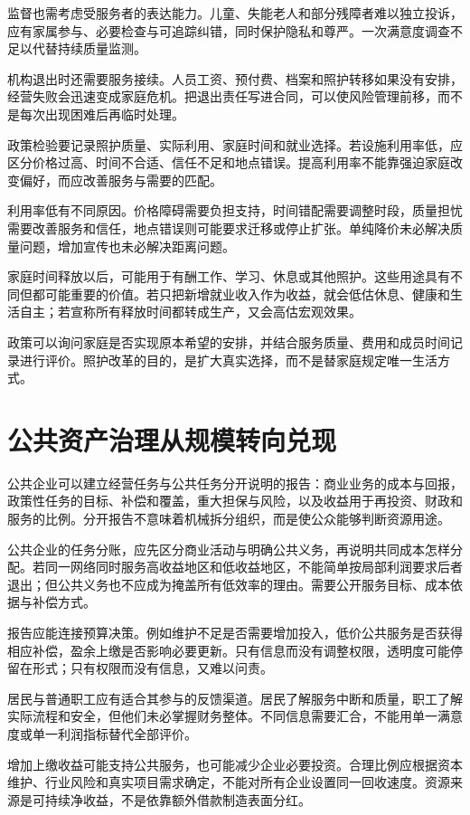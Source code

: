 \documentclass[UTF8,fontset=fandol,zihao=-4,oneside,openany]{ctexbook}
\begin{document}
监督也需考虑受服务者的表达能力。儿童、失能老人和部分残障者难以独立投诉，应有家属参与、必要检查与可追踪纠错，同时保护隐私和尊严。一次满意度调查不足以代替持续质量监测。

机构退出时还需要服务接续。人员工资、预付费、档案和照护转移如果没有安排，经营失败会迅速变成家庭危机。把退出责任写进合同，可以使风险管理前移，而不是每次出现困难后再临时处理。

政策检验要记录照护质量、实际利用、家庭时间和就业选择。若设施利用率低，应区分价格过高、时间不合适、信任不足和地点错误。提高利用率不能靠强迫家庭改变偏好，而应改善服务与需要的匹配。

\label{arg:P257}
利用率低有不同原因。价格障碍需要负担支持，时间错配需要调整时段，质量担忧需要改善服务和信任，地点错误则可能要求迁移或停止扩张。单纯降价未必解决质量问题，增加宣传也未必解决距离问题。

家庭时间释放以后，可能用于有酬工作、学习、休息或其他照护。这些用途具有不同但都可能重要的价值。若只把新增就业收入作为收益，就会低估休息、健康和生活自主；若宣称所有释放时间都转成生产，又会高估宏观效果。

政策可以询问家庭是否实现原本希望的安排，并结合服务质量、费用和成员时间记录进行评价。照护改革的目的，是扩大真实选择，而不是替家庭规定唯一生活方式。

\section{公共资产治理从规模转向兑现}
公共企业可以建立经营任务与公共任务分开说明的报告：商业业务的成本与回报，政策性任务的目标、补偿和覆盖，重大担保与风险，以及收益用于再投资、财政和服务的比例。分开报告不意味着机械拆分组织，而是使公众能够判断资源用途。

\label{arg:P258}
公共企业的任务分账，应先区分商业活动与明确公共义务，再说明共同成本怎样分配。若同一网络同时服务高收益地区和低收益地区，不能简单按局部利润要求后者退出；但公共义务也不应成为掩盖所有低效率的理由。需要公开服务目标、成本依据与补偿方式。

报告应能连接预算决策。例如维护不足是否需要增加投入，低价公共服务是否获得相应补偿，盈余上缴是否影响必要更新。只有信息而没有调整权限，透明度可能停留在形式；只有权限而没有信息，又难以问责。

居民与普通职工应有适合其参与的反馈渠道。居民了解服务中断和质量，职工了解实际流程和安全，但他们未必掌握财务整体。不同信息需要汇合，不能用单一满意度或单一利润指标替代全部评价。

增加上缴收益可能支持公共服务，也可能减少企业必要投资。合理比例应根据资本维护、行业风险和真实项目需求确定，不能对所有企业设置同一回收速度。资源来源是可持续净收益，不是依靠额外借款制造表面分红。
\end{document}
